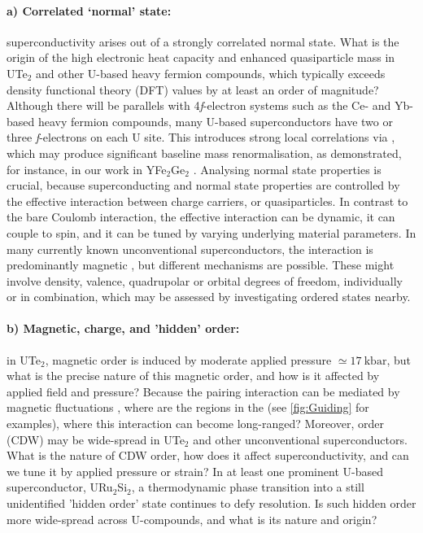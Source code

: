   
  \paragraph{a) Correlated `normal' state:} %
  superconductivity arises out of a strongly correlated normal state. What is the origin of the high electronic heat capacity and enhanced quasiparticle mass in UTe$_2$ and other U-based heavy fermion compounds, which typically exceeds density functional theory (DFT) values by at least an order of magnitude? Although there will be parallels with 4{\em f}-electron systems such as the Ce- and Yb-based heavy fermion compounds, many U-based superconductors have two or three {\emph f}-electrons on each U site. This introduces strong local correlations via , which may produce significant baseline mass renormalisation, as demonstrated, for instance, in our work in YFe$_2$Ge$_2$ \cite{baglo22}. Analysing normal state properties is crucial, because  superconducting and normal state properties are controlled by the effective interaction between charge carriers, or quasiparticles. In contrast to the bare Coulomb interaction, the effective interaction can be dynamic, it can couple to spin, and it can be tuned by varying underlying material parameters. In many currently known unconventional superconductors, the interaction is predominantly magnetic \cite{monthoux07}, but different mechanisms are possible. These might involve density, valence, quadrupolar or orbital degrees of freedom, individually or in combination, which may be assessed by investigating ordered states nearby. %
  
  
  \paragraph{b) Magnetic, charge, and 'hidden' order:} in UTe$_2$, magnetic order is induced by moderate applied pressure $\simeq \SI{17}{\kilo\bar}$, but what is the precise nature of this magnetic order, and how is it affected by applied field and pressure? Because the pairing interaction can be mediated by magnetic fluctuations \cite{monthoux07}, where are the regions in the  (see \autoref{fig:Guiding} for examples), where this interaction can become long-ranged? Moreover,  order (CDW) may be wide-spread in UTe$_2$ and other unconventional superconductors. What is the nature of CDW order, how does it affect superconductivity, and can we tune it by applied pressure or strain? In at least one prominent U-based superconductor, URu$_2$Si$_2$, a thermodynamic phase transition into a still unidentified 'hidden order' state continues to defy resolution. Is such hidden order more wide-spread across U-compounds, and what is its nature and origin?
  
